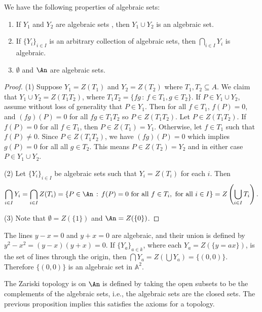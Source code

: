 \begin{proposition}
We have the following properties of algebraic sets:
\begin{enumerate}
\item
If $Y_1$ and $Y_2$ are algebraic sets , then $Y_1 \cup Y_2$ is an algebraic set.

\item
If $\{Y_i\}_{i \in I}$ is an arbitrary collection of algebraic sets, then $\bigcap_{i \in I} Y_i$ is algebraic.

\item
$\emptyset$ and $\An$ are algebraic sets.
\end{enumerate}
\end{proposition}
\begin{proof}
(1) Suppose $Y_1 = Z(T_1)$ and $Y_2 = Z(T_2)$ where $T_1, T_2 \subseteq A$.
We claim that $Y_1 \cup Y_2 = Z(T_1 T_2)$, where $T_1 T_2 = \{f g \, : \, f \in T_1, g \in T_2\}$.
If $P \in Y_1 \cup Y_2$, assume without loss of generality that $P \in Y_1$.
Then for all $f \in T_1$, $f(P) = 0$, and $(fg)(P) = 0$ for all $fg \in T_1 T_2$ so $P \in Z(T_1 T_2)$.
Let $P \in Z(T_1 T_2)$.
If $f(P) = 0$ for all $f \in T_1$, then $P \in Z(T_1) = Y_1$.
Otherwise, let $f \in T_1$ such that $f(P) \ne 0$.
Since $P \in Z(T_1 T_2)$, we have $(fg)(P) = 0$ which implies $g(P) = 0$ for all all $g \in T_2$.
This means $P \in Z(T_2) = Y_2$ and in either case $P \in Y_1 \cup Y_2$.

(2) Let $\{Y_i\}_{i \in I}$ be algebraic sets such that $Y_i = Z(T_i)$ for each $i$.
Then
$$\bigcap_{i \in I} Y_i = \bigcap_{i \in I} Z(T_i) = \{P \in \An \, : \, f(P) = 0 \text{ for all } f  \in T_i, \text{ for all } i \in I\} = Z\left( \bigcup_{i \in I} T_i\right).$$

(3) Note that $\emptyset = Z(\{1\})$ and $\An = Z(\{0\})$.
\end{proof}

\begin{example}
The lines $y - x = 0$ and $y + x = 0$ are algebraic, and their union is defined by $y^2 - x^2 = (y-x)(y+x) = 0$.
If $\{Y_a\}_{a \in k}$, where each $Y_a = Z(\{y=ax\})$, is the set of lines through the origin, then $\bigcap Y_a = Z \left(\bigcup Y_a\right) = \{(0, 0)\}$.
Therefore $\{(0, 0)\}$ is an algebraic set in $\mathbb{A}^2$. 
\end{example}

\begin{definition}
The Zariski topology is on $\An$ is defined by taking the open subsets to be the complements of the algebraic sets, i.e., the algebraic sets are the closed sets.
The previous proposition implies this satisfies the axioms for a topology.
\end{definition}


